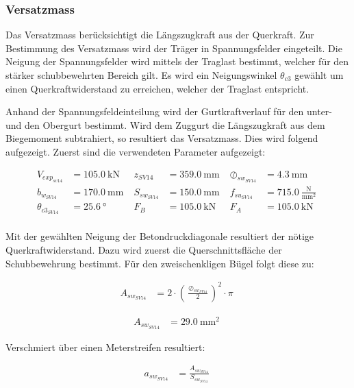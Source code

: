 \documentclass[
  11pt,
  letterpaper,
]{scrreprt}
\begin{document}
\subsubsection{Versatzmass}\label{versatzmass}

Das Versatzmass berücksichtigt die Längszugkraft aus der Querkraft. Zur
Bestimmung des Versatzmass wird der Träger in Spannungsfelder
eingeteilt. Die Neigung der Spannungsfelder wird mittels der Traglast
bestimmt, welcher für den stärker schubbewehrten Bereich gilt. Es wird
ein Neigungswinkel \(\theta_{c3}\) gewählt um einen Querkraftwiderstand
zu erreichen, welcher der Traglast entspricht.

Anhand der Spannungsfeldeinteilung wird der Gurtkraftverlauf für den
unter- und den Obergurt bestimmt. Wird dem Zuggurt die Längszugkraft aus
dem Biegemoment subtrahiert, so resultiert das Versatzmass. Dies wird
folgend aufgezeigt. Zuerst sind die verwendeten Parameter aufgezeigt:

$$
\begin{aligned}
V_{exp_{sv14}} &= 105.0\ \mathrm{kN} \; 
 &z_{SV14} &= 359.0\ \mathrm{mm} \; 
 &\oslash_{sw_{SV14}} &= 4.3\ \mathrm{mm} \; 
\\[12pt]
 b_{w_{SV14}} &= 170.0\ \mathrm{mm} \; 
 &S_{sw_{SV14}} &= 150.0\ \mathrm{mm} \; 
 &f_{su_{SV14}} &= 715.0\ \frac{\mathrm{N}}{\mathrm{mm}^{2}} \; 
\\[12pt]
 \theta_{c3_{SV14}} &= 25.6\ \mathrm{°} \; 
 &F_{B} &= 105.0\ \mathrm{kN} \; 
 &F_{A} &= 105.0\ \mathrm{kN} \; 
\\[12pt]
\end{aligned}
$$

Mit der gewählten Neigung der Betondruckdiagonale resultiert der nötige
Querkraftwiderstand. Dazu wird zuerst die Querschnittsfläche der
Schubbewehrung bestimmt. Für den zweischenkligen Bügel folgt diese zu:

$$
\begin{aligned}
A_{sw_{SV14}} &= 2 \cdot \left( \frac{ \oslash_{sw_{SV14}} }{ 2 } \right) ^{ 2 } \cdot \pi \; 
\end{aligned}
$$

$$
\begin{aligned}
A_{sw_{SV14}} &= 29.0\ \mathrm{mm}^{2} \;
\end{aligned}
$$

Verschmiert über einen Meterstreifen resultiert:

$$
\begin{aligned}
a_{sw_{SV14}} &= \frac{ A_{sw_{SV14}} }{ S_{sw_{SV14}} } \; 
\end{aligned}
$$
\end{document}
